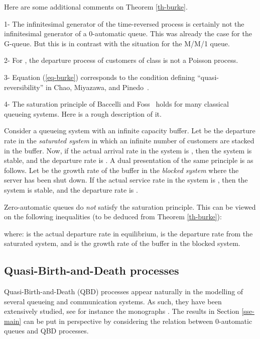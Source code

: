 \documentclass[11pt,a4paper]{article}
\theoremstyle{remark}
\def\eref#1{(\ref{#1})}
\begin{document}
Here are some additional comments on Theorem \ref{th-burke}.

\medskip

1- The infinitesimal generator of the time-reversed process
 is certainly not the infinitesimal generator of
a 0-automatic queue. This was already the case for the G-queue. But
this is in contrast with the situation for the M/M/1 queue. 

\medskip


2- For , the departure process  of
customers of class  is not a Poisson process.

\medskip

3- Equation \eref{eq-burke} corresponds to the condition defining
``quasi-reversibility'' in Chao, Miyazawa, and
Pinedo~\cite[Definition 3.4]{CMPi}. 

\medskip

4- The saturation principle of Baccelli and Foss~\cite{BaFo93b} holds
for many classical queueing systems. Here is a  rough description of
it.

Consider a queueing system with an infinite capacity
buffer.
Let  be the departure rate in the {\em saturated system} in
which an infinite number of
customers are stacked in the buffer.
Now, if the actual arrival rate in the system is , then the system is
stable, and the departure rate is .
A dual presentation of the same principle is as follows. Let 
be the growth rate of the buffer in the {\em blocked system} where the server has
been shut down.
If the actual service rate in the system is , then the
system is stable, and the departure rate is .

Zero-automatic queues do {\em not} satisfy the saturation principle.
This can be viewed on the following inequalities (to be deduced from
Theorem \ref{th-burke}):

where:  is the actual
 departure rate in equilibrium,  is the departure rate from the
 saturated system, and  is the
 growth rate of the buffer in the blocked system.

\subsection{Quasi-Birth-and-Death processes}

Quasi-Birth-and-Death (QBD) processes appear naturally in the
modelling of several queueing and
communication systems. As such, they have been extensively studied,
see for instance the monographs \cite{LaRa,neut}.
The results in Section \ref{sse-main} can be put in perspective by
considering the relation between 0-automatic queues and QBD
processes.
\end{document}
